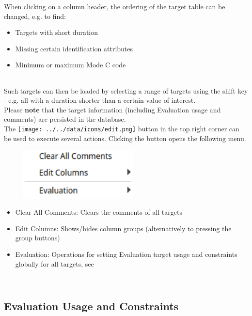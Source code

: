 When clicking on a column header, the ordering of the target table can be changed, e.g. to find:

\begin{itemize}  
\item Targets with short duration
\item Missing certain identification attributes
\item Minimum or maximum Mode C code
\end{itemize}
\ \\

Such targets can then be loaded by selecting a range of targets using the shift key - e.g. all with a duration shorter than a certain value of interest. \\

Please \textbf{note} that the target information (including Evaluation usage and comments) are persisted in the database. \\

The \texttt{[image: ../../data/icons/edit.png]} button in the top right corner can be used to execute several actions.
Clicking the button opens the following menu.

\begin{figure}[H]
    \center
    \includegraphics[width=6cm,frame]{figures/ui_targets_config.png}
\end{figure}

\begin{itemize}
  \item Clear All Comments: Clears the comments of all targets
  \item Edit Columns: Shows/hides column groups (alternatively to pressing the group buttons)
  \item Evaluation: Operations for setting Evaluation target usage and constraints globally for all targets, see 
 \end{itemize} 
 \  \\

\subsection{Evaluation Usage and Constraints}
\label{sec:ui_eval_usage}

